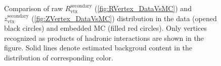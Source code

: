 \begin{figure}[b!]
\centering
\parbox{0.4725\textwidth}{
  \centering
  \begin{subfigure}[b]{\linewidth}
  \end{subfigure}
}%
\quad\quad%
\parbox{0.4725\textwidth}{
  \centering
  \begin{subfigure}[b]{\linewidth}
  \end{subfigure}
}\vspace{-5pt}%
\caption[Comparison of raw $R_{\text{vtx}}^{\text{secondary}}$ and $z_{\text{vtx}}^{\text{secondary}}$ distribution in the data and embedded MC.]%
{Comparison of raw $R_{\text{vtx}}^{\text{secondary}}$ (\ref{fig:RVertex_DataVsMC}) and $z_{\text{vtx}}^{\text{secondary}}$ (\ref{fig:ZVertex_DataVsMC}) distribution in the data (opened black circles) and embedded MC (filled red circles). Only vertices recognized as products of hadronic interactions are shown in the figure. Solid lines denote estimated backgroud content in the distribution of corresponding color.}\vspace{-10pt}\label{fig:RZVertexDataVsMC}%
\end{figure}
